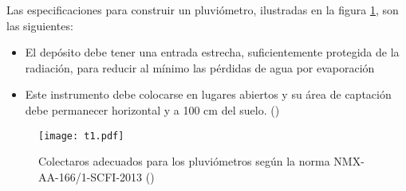 Las especificaciones para construir un pluviómetro, ilustradas en la figura \ref{t1}, son las siguientes:
\begin{itemize}
    \item El depósito debe tener una entrada estrecha, suficientemente protegida de la radiación, para reducir al mínimo las pérdidas de agua por evaporación
    \item Este instrumento debe colocarse en lugares abiertos y su área de captación debe permanecer horizontal y a 100 cm del suelo. (\cite{se2013})
\end{itemize}

\begin{figure}[h!]
\centering
  \texttt{[image: t1.pdf]}
  \caption{Colectaros adecuados para los pluviómetros según la norma NMX-AA-166/1-SCFI-2013 (\cite{se2013})}
  \label{t1}
\end{figure}

% 













